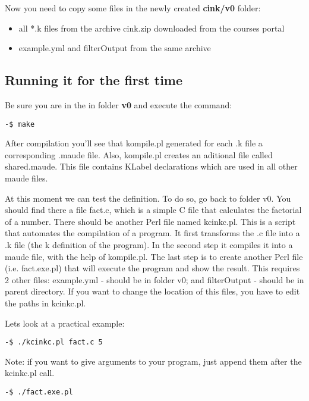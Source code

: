 \documentclass[11pt,a4paper]{article}
\begin{document}
\noindent Now you need to copy some files in the newly created {\bf cink/v0} folder:

\begin{itemize}
\item all *.k files from the archive cink.zip downloaded from the courses portal
\item example.yml and filterOutput from the same archive
\end{itemize}

\subsection{Running it for the first time}

Be sure you are in the in folder {\bf v0} and execute the command:

\begin{verbatim}
-$ make
\end{verbatim}

After compilation you’ll see that kompile.pl generated for each .k file a corresponding .maude file. Also, kompile.pl creates an aditional file called shared.maude. This file contains KLabel declarations which are used in all other maude files.

At this moment we can test the definition. To do so, go back to folder v0. You should find there a file fact.c, which is a simple C file that calculates the factorial of a number. There should be another Perl file named kcinkc.pl. This is a script that automates the compilation of a program. It first transforms the .c file into a .k file (the k definition of the program). In the second step it compiles it into a maude file, with the help of kompile.pl. The last step is to create another Perl file (i.e. fact.exe.pl) that will execute the program and show the result.
This requires 2 other files: example.yml - should be in folder v0; and filterOutput - should be in parent directory. If you want to change the location of this files, you have to edit the paths in kcinkc.pl.

Lets look at a practical example:

\begin{verbatim}
-$ ./kcinkc.pl fact.c 5
\end{verbatim}
Note: if you want to give arguments to your program, just append them after the kcinkc.pl call.

\begin{verbatim}
-$ ./fact.exe.pl
\end{verbatim}
\end{document}
